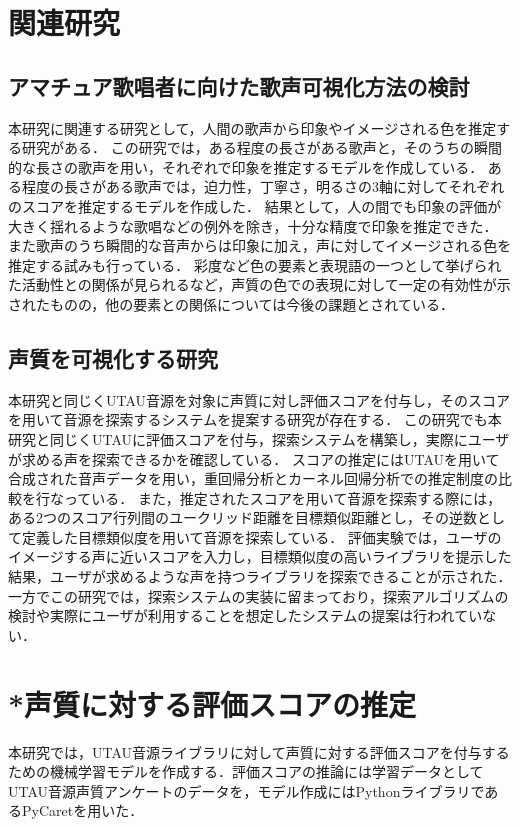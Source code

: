 \documentclass[a4j,8pt,twocolumn]{extarticle}
\begin{document}
\section{関連研究}
\subsection{アマチュア歌唱者に向けた歌声可視化方法の検討}
本研究に関連する研究として，人間の歌声から印象やイメージされる色を推定する研究\cite{ama}がある．
この研究では，ある程度の長さがある歌声と，そのうちの瞬間的な長さの歌声を用い，それぞれで印象を推定するモデルを作成している．
ある程度の長さがある歌声では，迫力性，丁寧さ，明るさの3軸に対してそれぞれのスコアを推定するモデルを作成した．
結果として，人の間でも印象の評価が大きく揺れるような歌唱などの例外を除き，十分な精度で印象を推定できた．
また歌声のうち瞬間的な音声からは印象に加え，声に対してイメージされる色を推定する試みも行っている．
彩度など色の要素と表現語の一つとして挙げられた活動性との関係が見られるなど，声質の色での表現に対して一定の有効性が示されたものの，他の要素との関係については今後の課題とされている．

\subsection{声質を可視化する研究}
本研究と同じくUTAU音源を対象に声質に対し評価スコアを付与し，そのスコアを用いて音源を探索するシステムを提案する研究\cite{ong}が存在する．
この研究でも本研究と同じくUTAUに評価スコアを付与，探索システムを構築し，実際にユーザが求める声を探索できるかを確認している．
スコアの推定にはUTAUを用いて合成された音声データを用い，重回帰分析とカーネル回帰分析での推定制度の比較を行なっている．
また，推定されたスコアを用いて音源を探索する際には，ある2つのスコア行列間のユークリッド距離を目標類似距離とし，その逆数として定義した目標類似度を用いて音源を探索している．
評価実験では，ユーザのイメージする声に近いスコアを入力し，目標類似度の高いライブラリを提示した結果，ユーザが求めるような声を持つライブラリを探索できることが示された．
一方でこの研究では，探索システムの実装に留まっており，探索アルゴリズムの検討や実際にユーザが利用することを想定したシステムの提案は行われていない．

\section{*声質に対する評価スコアの推定}
本研究では，UTAU音源ライブラリに対して声質に対する評価スコアを付与するための機械学習モデルを作成する．評価スコアの推論には学習データとしてUTAU音源声質アンケートのデータを，モデル作成にはPythonライブラリであるPyCaretを用いた．
\end{document}

